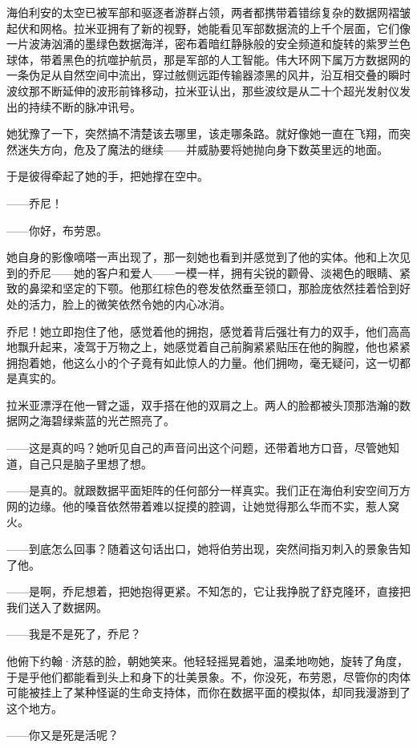 \documentclass[AutoFakeBold=true]{book}
\begin{document}
海伯利安的太空已被军部和驱逐者游群占领，两者都携带着错综复杂的数据网褶皱起伏和网格。拉米亚拥有了新的视野，她能看见军部数据流的上千个层面，它们像一片波涛汹涌的墨绿色数据海洋，密布着暗红静脉般的安全频道和旋转的紫罗兰色球体，带着黑色的抗噬护航员，那是军部的人工智能。伟大环网下属万方数据网的一条伪足从自然空间中流出，穿过舷侧远距传输器漆黑的风井，沿互相交叠的瞬时波纹那不断延伸的波形前锋移动，拉米亚认出，那些波纹是从二十个超光发射仪发出的持续不断的脉冲讯号。

她犹豫了一下，突然搞不清楚该去哪里，该走哪条路。就好像她一直在飞翔，而突然迷失方向，危及了魔法的继续——并威胁要将她抛向身下数英里远的地面。

于是彼得牵起了她的手，把她撑在空中。

{\kaishu ——乔尼！}

{\kaishu ——你好，布劳恩。}

她自身的影像嘀嗒一声出现了，那一刻她也看到并感觉到了他的实体。他和上次见到的乔尼——她的客户和爱人——一模一样，拥有尖锐的颧骨、淡褐色的眼睛、紧致的鼻梁和坚定的下颚。他那红棕色的卷发依然垂至领口，那脸庞依然挂着恰到好处的活力，脸上的微笑依然令她的内心冰消。

{\kaishu 乔尼！}她立即抱住了他，{\kaishu 感觉}着他的拥抱，感觉着背后强壮有力的双手，他们高高地飘升起来，凌驾于万物之上，她感觉着自己前胸紧紧贴压在他的胸膛，他也紧紧拥抱着她，他这么小的个子竟有如此惊人的力量。他们拥吻，毫无疑问，{\kaishu 这一切}都是真实的。

拉米亚漂浮在他一臂之遥，双手搭在他的双肩之上。两人的脸都被头顶那浩瀚的数据网之海碧绿紫蓝的光芒照亮了。

{\kaishu ——这是真的吗？}她听见自己的声音问出这个问题，还带着地方口音，尽管她知道，自己只是脑子里想了想。

{\kaishu ——是真的。就跟数据平面矩阵的任何部分一样真实。我们正在海伯利安空间万方网的边缘。}他的嗓音依然带着难以捉摸的腔调，让她觉得那么华而不实，惹人窝火。

{\kaishu ——到底怎么回事？}随着这句话出口，她将伯劳出现，突然间指刃刺入的景象告知了他。

{\kaishu ——是啊，}乔尼想着，把她抱得更紧。{\kaishu 不知怎的，它让我挣脱了舒克隆环，直接把我们送入了数据网。}

{\kaishu ——我是不是死了，乔尼？}

他俯下约翰·济慈的脸，朝她笑来。他轻轻摇晃着她，温柔地吻她，旋转了角度，于是乎他们都能看到头上和身下的壮美景象。{\kaishu 不，你没死，布劳恩，尽管你的肉体可能被挂上了某种怪诞的生命支持体，而你在数据平面的模拟体，却同我漫游到了这个地方。}

{\kaishu ——你又是死是活呢？}
\end{document}
